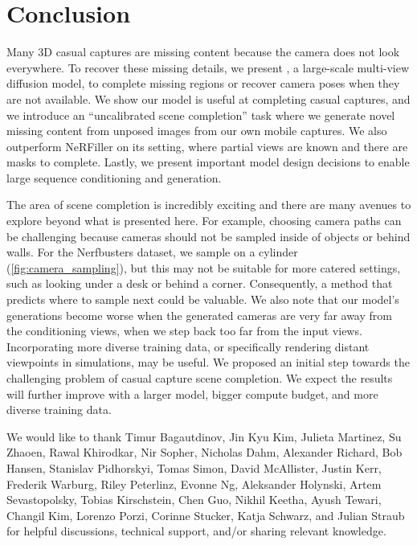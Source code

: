 \vspace{-10px}
\section{Conclusion}

Many 3D casual captures are missing content because the camera does not look everywhere.
To recover these missing details, we present \method{}, a large-scale multi-view diffusion model, to complete missing regions or recover camera poses when they are not available.
We show our model is useful at completing casual captures, and we introduce an ``uncalibrated scene completion'' task where we generate novel missing content from unposed images from our own mobile captures.
We also outperform NeRFiller on its setting, where partial views are known and there are masks to complete.
Lastly, we present important model design decisions to enable large sequence conditioning and generation.

The area of scene completion is incredibly exciting and there are many avenues to explore beyond what is presented here.
For example, choosing camera paths can be challenging because cameras should not be sampled inside of objects or behind walls.
For the Nerfbusters dataset, we sample on a cylinder (\cref{fig:camera_sampling}), but this may not be suitable for more catered settings, such as looking under a desk or behind a corner.
Consequently, a method that predicts where to sample next could be valuable.
We also note that our model's generations become worse when the generated cameras are very far away from the conditioning views, \eg when we step back too far from the input views.
Incorporating more diverse training data, or specifically rendering distant viewpoints in simulations, may be useful.
We proposed an initial step towards the challenging problem of casual capture scene completion. We expect the results will further improve with a larger model, bigger compute budget, and more diverse training data.

\vspace{1em}
We would like to thank
Timur Bagautdinov,
Jin Kyu Kim,
Julieta Martinez,
Su Zhaoen,
Rawal Khirodkar,
Nir Sopher,
Nicholas Dahm,
Alexander Richard,
Bob Hansen,
Stanislav Pidhorskyi,
Tomas Simon,
David McAllister,
Justin Kerr,
Frederik Warburg,
Riley Peterlinz,
Evonne Ng,
Aleksander Holynski,
Artem Sevastopolsky,
Tobias Kirschstein,
Chen Guo,
Nikhil Keetha,
Ayush Tewari,
Changil Kim,
Lorenzo Porzi,
Corinne Stucker,
Katja Schwarz, and
Julian Straub
for helpful discussions, technical support, and/or sharing relevant \mbox{knowledge}.